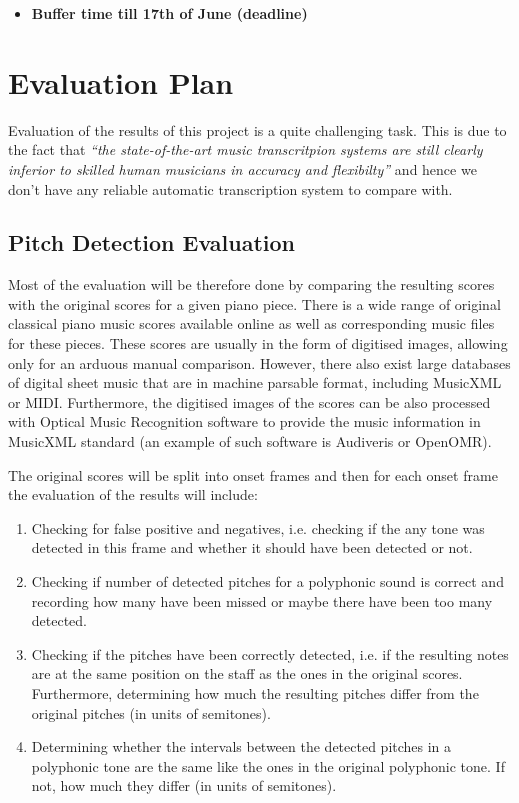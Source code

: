 \documentclass[11pt]{article} %
\begin{document}
\begin{itemize}
\item \textbf{Buffer time till 17th of June (deadline)}
\end{itemize}


\section{Evaluation Plan}

Evaluation of the results of this project is a quite challenging task. This is due to the fact that \textit{``the state-of-the-art music transcritpion systems are still clearly inferior to skilled human musicians in accuracy and flexibilty''} \citep*{Klapuri2006} and hence we don't have any reliable automatic transcription system to compare with.

\subsection{Pitch Detection Evaluation}

Most of the evaluation will be therefore done by comparing the resulting scores with the original scores for a given piano piece. There is a wide range of original classical piano music scores available online as well as corresponding music files for these pieces. These scores are usually in the form of digitised images, allowing only for an arduous manual comparison. However, there also exist large databases of digital sheet music that are in machine parsable format, including MusicXML or MIDI. Furthermore, the digitised images of the scores can be also processed with Optical Music Recognition software to provide the music information in MusicXML standard (an example of such software is Audiveris or OpenOMR).


The original scores will be split into onset frames and then for each onset frame the evaluation of the results will include:

\begin{enumerate}
\item Checking for false positive and negatives, i.e. checking if the any tone was detected in this frame and whether it should have been detected or not.
\item Checking if number of detected pitches for a polyphonic sound is correct and recording how many have been missed or maybe there have been too many detected.
\item Checking if the pitches have been correctly detected, i.e. if the resulting notes are at the same position on the staff as the ones in the original scores. Furthermore, determining how much the resulting pitches differ from the original pitches (in units of semitones).
\item Determining whether the intervals between the detected pitches in a polyphonic tone are the same like the ones in the original polyphonic tone. If not, how much they differ (in units of semitones).
\end{enumerate}
\end{document}
